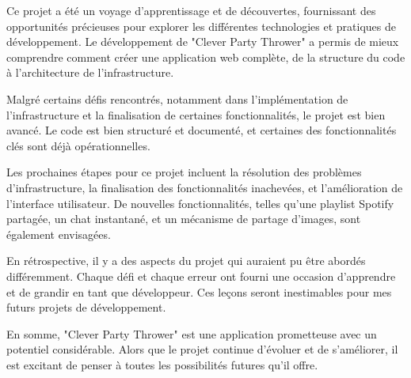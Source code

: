 \documentclass[12pt, a4paper, oneside]{article}
\begin{document}
    Ce projet a été un voyage d'apprentissage et de découvertes,
    fournissant des opportunités précieuses pour explorer les différentes technologies et pratiques de développement.
    Le développement de "Clever Party Thrower" a permis de mieux comprendre comment créer une application web complète,
    de la structure du code à l'architecture de l'infrastructure.

    Malgré certains défis rencontrés, notamment dans l'implémentation de l'infrastructure et la finalisation de certaines fonctionnalités,
    le projet est bien avancé.
    Le code est bien structuré et documenté, et certaines des fonctionnalités clés sont déjà opérationnelles.

    Les prochaines étapes pour ce projet incluent la résolution des problèmes d'infrastructure,
    la finalisation des fonctionnalités inachevées, et l'amélioration de l'interface utilisateur.
    De nouvelles fonctionnalités, telles qu'une playlist Spotify partagée, un chat instantané,
    et un mécanisme de partage d'images, sont également envisagées.

    En rétrospective, il y a des aspects du projet qui auraient pu être abordés différemment.
    Chaque défi et chaque erreur ont fourni une occasion d'apprendre et de grandir en tant que développeur.
    Ces leçons seront inestimables pour mes futurs projets de développement.

    En somme, "Clever Party Thrower" est une application prometteuse avec un potentiel considérable.
    Alors que le projet continue d'évoluer et de s'améliorer, il est excitant de penser à toutes les possibilités futures qu'il offre.

    \newpage
    \printbibliography
\end{document}
